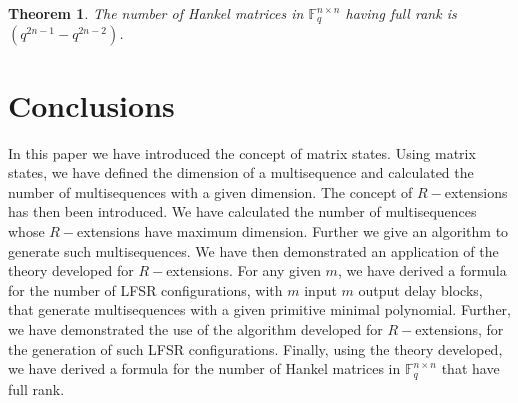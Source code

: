 \documentclass[letterpaper, 12 pt]{article}  \usepackage{amssymb}
\newtheorem{theorem}{Theorem}[section]
\newcommand{\F}{\mathbb{F}}
\begin{document}
\begin{theorem}
The number of Hankel matrices in $\F_q^{n \times n}$ having full rank is
$(q^{2n-1}- q^{2n-2})$. 
\end{theorem}
 




\section{Conclusions}
In this paper we have introduced the concept of matrix states. Using matrix
states, we have defined the dimension of a multisequence and calculated the
number of multisequences with a given dimension. The concept of $R-$extensions
has then been introduced. We have calculated the number of multisequences
whose
$R-$extensions have maximum dimension. Further we give an algorithm to
generate such multisequences.  We have then demonstrated an application of the
theory developed for $R-$extensions. For any given $m$, we have derived a
formula for the number of LFSR configurations, with $m$ input $m$ output
delay blocks, that generate multisequences with a given primitive minimal
polynomial. Further, we have demonstrated the use of the algorithm developed for
$R-$extensions, for the generation of such LFSR configurations. Finally, using
the theory developed, we have derived a formula for the number of Hankel
matrices in $\F_q^{n \times n}$ that have full rank.
       
 \nopagebreak


\end{document}
